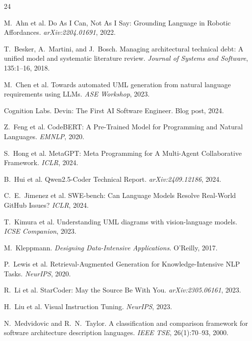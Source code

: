 \documentclass{article}
\begin{document}
\begin{thebibliography}{24}

M.~Ahn et al.
\newblock Do As I Can, Not As I Say: Grounding Language in Robotic Affordances.
\newblock \emph{arXiv:2204.01691}, 2022.

T.~Besker, A.~Martini, and J.~Bosch.
\newblock Managing architectural technical debt: A unified model and systematic literature review.
\newblock \emph{Journal of Systems and Software}, 135:1--16, 2018.

M.~Chen et al.
\newblock Towards automated UML generation from natural language requirements using LLMs.
\newblock \emph{ASE Workshop}, 2023.

Cognition Labs.
\newblock Devin: The First AI Software Engineer.
\newblock Blog post, 2024.

Z.~Feng et al.
\newblock CodeBERT: A Pre-Trained Model for Programming and Natural Languages.
\newblock \emph{EMNLP}, 2020.

S.~Hong et al.
\newblock MetaGPT: Meta Programming for A Multi-Agent Collaborative Framework.
\newblock \emph{ICLR}, 2024.

B.~Hui et al.
\newblock Qwen2.5-Coder Technical Report.
\newblock \emph{arXiv:2409.12186}, 2024.

C.~E.~Jimenez et al.
\newblock SWE-bench: Can Language Models Resolve Real-World GitHub Issues?
\newblock \emph{ICLR}, 2024.

T.~Kimura et al.
\newblock Understanding UML diagrams with vision-language models.
\newblock \emph{ICSE Companion}, 2023.

M.~Kleppmann.
\newblock \emph{Designing Data-Intensive Applications}.
\newblock O'Reilly, 2017.

P.~Lewis et al.
\newblock Retrieval-Augmented Generation for Knowledge-Intensive NLP Tasks.
\newblock \emph{NeurIPS}, 2020.

R.~Li et al.
\newblock StarCoder: May the Source Be With You.
\newblock \emph{arXiv:2305.06161}, 2023.

H.~Liu et al.
\newblock Visual Instruction Tuning.
\newblock \emph{NeurIPS}, 2023.

N.~Medvidovic and R.~N.~Taylor.
\newblock A classification and comparison framework for software architecture description languages.
\newblock \emph{IEEE TSE}, 26(1):70--93, 2000.


\end{thebibliography}
\end{document}
